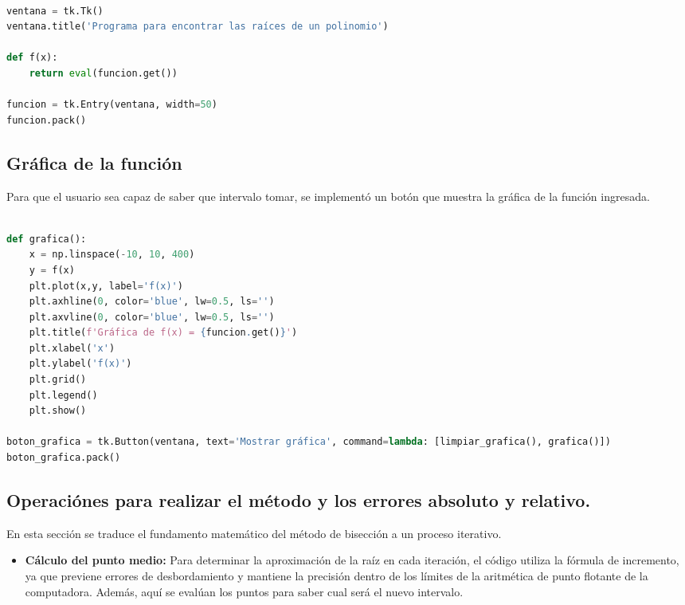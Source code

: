 \documentclass{rmf-d}
\begin{document}
\begin{multicols}{2}
\begin{lstlisting}[language=Python, caption={Configuración inicial y captura de la función.}]

ventana = tk.Tk()
ventana.title('Programa para encontrar las raíces de un polinomio')

def f(x):
    return eval(funcion.get())

funcion = tk.Entry(ventana, width=50)
funcion.pack()
\end{lstlisting}

\subsection{Gráfica de la función}
Para que el usuario sea capaz de saber que intervalo tomar, se implementó un botón que muestra la gráfica de la función ingresada.



\begin{lstlisting}[language=Python, caption={Gráfica de la función y boton para mostrarla}]

def grafica():
    x = np.linspace(-10, 10, 400)
    y = f(x)
    plt.plot(x,y, label='f(x)')
    plt.axhline(0, color='blue', lw=0.5, ls='')
    plt.axvline(0, color='blue', lw=0.5, ls='')
    plt.title(f'Gráfica de f(x) = {funcion.get()}')
    plt.xlabel('x')
    plt.ylabel('f(x)')
    plt.grid()
    plt.legend()
    plt.show()
    
boton_grafica = tk.Button(ventana, text='Mostrar gráfica', command=lambda: [limpiar_grafica(), grafica()])
boton_grafica.pack()
\end{lstlisting}

\subsection{Operaciónes para realizar el método y los errores absoluto y relativo.}

En esta sección se traduce el fundamento matemático del método de bisección a un proceso iterativo.
\begin{itemize}
    \item \textbf{Cálculo del punto medio:} Para determinar la aproximación de la raíz en cada iteración, el código utiliza la fórmula de incremento, ya que previene errores de desbordamiento y mantiene la precisión dentro de los límites de la aritmética de punto flotante de la computadora. Además, aquí se evalúan los puntos para saber cual será el nuevo intervalo.


\end{itemize}
\end{multicols}
\end{document}

